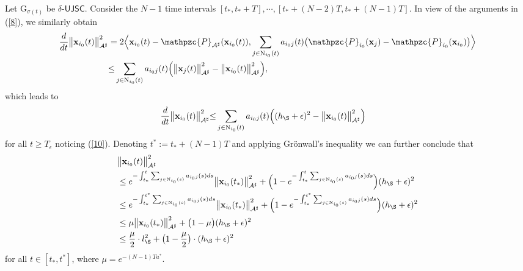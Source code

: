 \documentclass[a4paper, 11pt]{article}
\begin{document}
\noindent  Let  $\mathrm{G}_{\sigma(t)}$ be $\delta$-$\mathsf{UJSC}$. Consider the $N-1$ time intervals $[t_\ast,t_\ast +T],\cdots,[t_\ast+(N-2)T,t_\ast +(N-1)T]$. In view of the arguments in (\ref{8}), we similarly obtain
\begin{align}\label{12}
\frac{d}{dt} \big\|\mathbf{x}_{i_0}(t)\big\|_{\mathcal{A}^\sharp}^2&=2\Big\langle \mathbf{x}_{i_0}(t)-\mathpzc{P}_{\mathcal{A}^\sharp}(\mathbf{x}_{i_0}(t)), 
 \sum_{j\in \mathrm{N}_{i_0}(t)}a_{i_0j}(t)\big(\mathpzc{P}_{i_0}(\mathbf{x}_j)-\mathpzc{P}_{i_0}(\mathbf{x}_{i_0})\big)\Big\rangle\nonumber\\
&{\leq}   \sum_{j\in \mathrm{N}_{i_0}(t)}{a_{i_0j}(t)} \Big(\big\|\mathbf{x}_j(t)\big\|_{\mathcal{A}^\sharp}^2 - \big\|\mathbf{x}_{i_0}(t)\big\|_{\mathcal{A}^\sharp}^2  \Big),
\end{align}
which leads to
\begin{align}
\frac{d}{dt}\big \|\mathbf{x}_{i_0}(t)\big\|_{\mathcal{A}^\sharp}^2
&{\leq}   \sum_{j\in \mathrm{N}_{i_0}(t)}{a_{i_0j}(t)} \Big( (h_\S +\epsilon)^2 - \big\|\mathbf{x}_{i_0}(t)\big\|_{\mathcal{A}^\sharp}^2  \Big)
\end{align}
for all $ t\geq T_\epsilon$ noticing (\ref{10}). Denoting $t^\ast:=t_\ast +(N-1)T$ and applying  Gr\"{o}nwall's inequality we can further conclude that
\begin{align}
&\big \|\mathbf{x}_{i_0}(t)\big\|_{\mathcal{A}^\sharp}^2
 \nonumber\\
 &\leq e^{-\int_{t_\ast}^t \sum_{j\in \mathrm{N}_{i_0}(s)}{a_{i_0j}(s)}ds } \big\|\mathbf{x}_{i_0}(t_\ast)\big\|_{\mathcal{A}^\sharp}^2+\Big(1- e^{-\int_{t_\ast}^t \sum_{j\in \mathrm{N}_{i_0}(s)}{a_{i_0j}(s)}ds }\Big) (h_\S +\epsilon)^2 \nonumber\\
&\leq e^{-\int_{t_\ast}^{t^\ast} \sum_{j\in \mathrm{N}_{i_0}(s)}{a_{i_0j}(s)}ds } \big\|\mathbf{x}_{i_0}(t_\ast)\big\|_{\mathcal{A}^\sharp}^2 +\Big(1- e^{-\int_{t_\ast}^{t^\ast}  \sum_{j\in \mathrm{N}_{i_0}(s)}{a_{i_0j}(s)}ds }\Big) (h_\S +\epsilon)^2 \nonumber\\
&\leq  \mu \big\|\mathbf{x}_{i_0}(t_\ast)\big\|_{\mathcal{A}^\sharp}^2+\big(1-\mu\big) (h_\S +\epsilon)^2 \nonumber\\
&\leq  \frac{\mu}{2} \cdot l_\S^2+\big(1-\frac{\mu}{2}\big) \cdot(h_\S +\epsilon)^2
\end{align}
for all $t\in[t_\ast,t^\ast]$, where $\mu=e^{- (N-1)T a^\ast } $.
\end{document}
